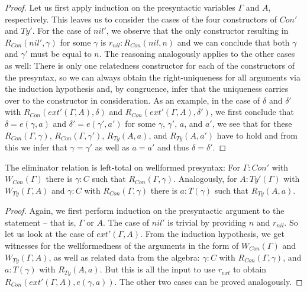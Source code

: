 \begin{proof}
Let us first apply induction on the presyntactic variables $\Gamma$ and $A$,
respectively.
This leaves us to consider the cases of the four constructors of $Con'$ and $Ty'$.
For the case of $nil'$, we observe that the only constructor resulting in
$R_{Con}(nil', \gamma)$ for some $\gamma$ is $r_{nil} : R_{Con}(nil, n)$ and we
can conclude that both $\gamma$ and $\gamma'$ must be equal to $n$.
The reasoning analogously applies to the other cases as well:
There is only one relatedness constructor for each of the constructors of the
presyntax, so we can always obtain the right-uniqueness for all arguments via
the induction hypothesis and, by congruence, infer that the uniqueness carries
over to the constructor in consideration.
As an example, in the case of $\delta$ and $\delta'$ with $R_{Con}(ext'(\Gamma, A), \delta)$
and $R_{Con}(ext'(\Gamma, A), \delta')$, we first conclude that
$\delta = e(\gamma, a)$ and $\delta' = e(\gamma', a')$ for some $\gamma$, $\gamma'$,
$a$, and $a'$, we see that for these $R_{Con}(\Gamma, \gamma)$, $R_{Con}(\Gamma, \gamma')$,
$R_{Ty}(A, a)$, and $R_{Ty}(A, a')$ have to hold and from this we infer
that $\gamma = \gamma'$ as well as $a = a'$ and thus $\delta = \delta'$.
\end{proof}

\begin{lemma}\label{lem:red-ex-total}
The eliminator relation is left-total on wellformed presyntax:
For $\Gamma : Con'$ with $W_{Con}(\Gamma)$ there is $\gamma : C$
such that $R_{Con}(\Gamma, \gamma)$.
Analogously, for $A : Ty'(\Gamma)$ with $W_{Ty}(\Gamma, A)$
and $\gamma : C$ with $R_{Con}(\Gamma, \gamma)$
there is $a : T(\gamma)$
such that $R_{Ty}(A, a)$.
\end{lemma}

\begin{proof}
Again, we first perform induction on the presyntactic argument to the statement
-- that is, $\Gamma$ or $A$.
The case of $nil'$ is trivial by providing $n$ and $r_{nil}$.
So let us look at the case of $ext'(\Gamma, A)$.
From the induction hypothesis, we get witnesses for the wellformedness of the
arguments in the form of $W_{Con}(\Gamma)$ and $W_{Ty}(\Gamma, A)$,
as well as related data from the algebra:
$\gamma : C$ with $R_{Con}(\Gamma, \gamma)$, and
$a : T(\gamma)$ with $R_{Ty}(A, a)$.
But this is all the input to use $r_{ext}$ to obtain $R_{Con}(ext'(\Gamma, A), e(\gamma, a))$.
The other two cases can be proved analogously.
\end{proof}

